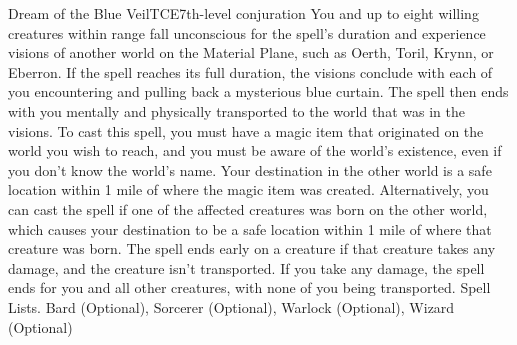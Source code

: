 \begin{spell}{Dream of the Blue Veil}{TCE}{7th-level conjuration}
{
}
You and up to eight willing creatures within range fall unconscious for the spell's duration and experience visions of another world on the Material Plane, such as Oerth, Toril, Krynn, or Eberron. If the spell reaches its full duration, the visions conclude with each of you encountering and pulling back a mysterious blue curtain. The spell then ends with you mentally and physically transported to the world that was in the visions.
To cast this spell, you must have a magic item that originated on the world you wish to reach, and you must be aware of the world’s existence, even if you don’t know the world’s name. Your destination in the other world is a safe location within 1 mile of where the magic item was created. Alternatively, you can cast the spell if one of the affected creatures was born on the other world, which causes your destination to be a safe location within 1 mile of where that creature was born.
The spell ends early on a creature if that creature takes any damage, and the creature isn’t transported. If you take any damage, the spell ends for you and all other creatures, with none of you being transported.
Spell Lists. Bard (Optional), Sorcerer (Optional), Warlock (Optional), Wizard (Optional)
\end{spell}

